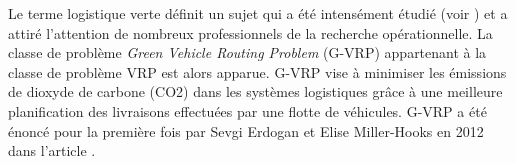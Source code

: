 Le terme \og logistique verte \fg{} définit un sujet qui a été intensément étudié (voir \cite{Alizadeh_Foroutan_2020} \cite{article_GVRP12} \cite{Antonio_2020} \cite{article_GVRP10} \cite{article_GVRP2} \cite{article_GVRP11} \cite{article_GVRP13} \cite{article_GVRP9} \cite{article_GVRP14} \cite{article_GVRP4} \cite{article_GVRP15} \cite{Ferani_2020}) et a attiré l'attention de nombreux professionnels de la recherche opérationnelle. La classe de problème \textit{Green Vehicle Routing Problem} (G-VRP) appartenant à la classe de problème VRP est alors apparue. G-VRP vise à minimiser les émissions de dioxyde de carbone (CO2) dans les systèmes logistiques grâce à une meilleure planification des livraisons effectuées par une flotte de véhicules. G-VRP a été énoncé pour la première fois par Sevgi Erdogan et Elise Miller-Hooks en 2012 dans l'article \cite{article_GVRP2}.

